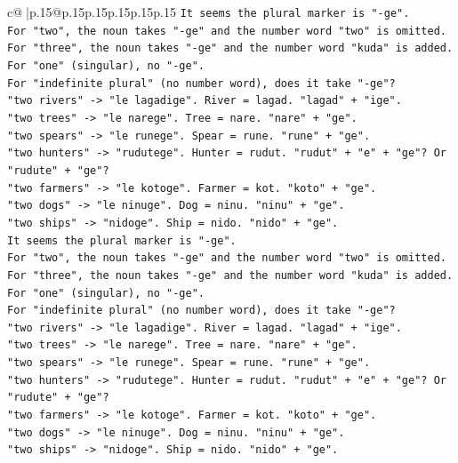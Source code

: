 \documentclass{article}
\begin{document}
{\begin{supertabular}{c@{$\;$}|p{.15\linewidth}@{}p{.15\linewidth}p{.15\linewidth}p{.15\linewidth}p{.15\linewidth}p{.15\linewidth}}
{{{\texttt{It seems the plural marker is "{-}ge".} \\
\texttt{For "two", the noun takes "{-}ge" and the number word "two" is omitted.} \\
\texttt{For "three", the noun takes "{-}ge" and the number word "kuda" is added.} \\
\texttt{For "one" (singular), no "{-}ge".} \\
\texttt{For "indefinite plural" (no number word), does it take "{-}ge"?} \\
\texttt{"two rivers" {-}> "le lagadige". River = lagad. "lagad" + "ige".} \\
\texttt{"two trees" {-}> "le narege". Tree = nare. "nare" + "ge".} \\
\texttt{"two spears" {-}> "le runege". Spear = rune. "rune" + "ge".} \\
\texttt{"two hunters" {-}> "rudutege". Hunter = rudut. "rudut" + "e" + "ge"? Or "rudute" + "ge"?} \\
\texttt{"two farmers" {-}> "le kotoge". Farmer = kot. "koto" + "ge".} \\
\texttt{"two dogs" {-}> "le ninuge". Dog = ninu. "ninu" + "ge".} \\
\texttt{"two ships" {-}> "nidoge". Ship = nido. "nido" + "ge".} \\
\texttt{It seems the plural marker is "{-}ge".} \\
\texttt{For "two", the noun takes "{-}ge" and the number word "two" is omitted.} \\
\texttt{For "three", the noun takes "{-}ge" and the number word "kuda" is added.} \\
\texttt{For "one" (singular), no "{-}ge".} \\
\texttt{For "indefinite plural" (no number word), does it take "{-}ge"?} \\
\texttt{"two rivers" {-}> "le lagadige". River = lagad. "lagad" + "ige".} \\
\texttt{"two trees" {-}> "le narege". Tree = nare. "nare" + "ge".} \\
\texttt{"two spears" {-}> "le runege". Spear = rune. "rune" + "ge".} \\
\texttt{"two hunters" {-}> "rudutege". Hunter = rudut. "rudut" + "e" + "ge"? Or "rudute" + "ge"?} \\
\texttt{"two farmers" {-}> "le kotoge". Farmer = kot. "koto" + "ge".} \\
\texttt{"two dogs" {-}> "le ninuge". Dog = ninu. "ninu" + "ge".} \\
\texttt{"two ships" {-}> "nidoge". Ship = nido. "nido" + "ge".} \\
}}}
\end{supertabular}}
\end{document}
